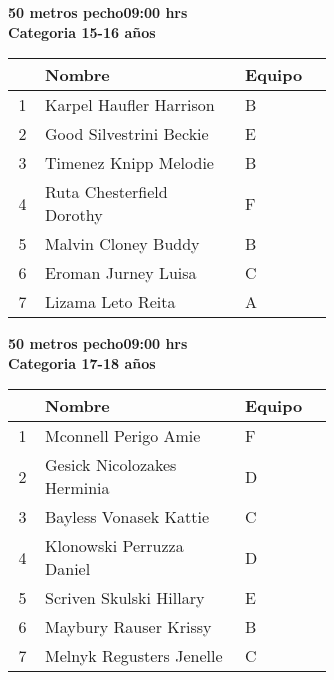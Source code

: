 \begin{minipage}{0.95\linewidth}\vspace{0.5cm} 
\begin{flushleft}
\textbf{
\hspace{-0.15cm}50 metros pecho\hspace{1.5cm}09:00 hrs \\Categoria 15-16 años}\vspace{-0.2cm} 
\end{flushleft}
\begin{tabular}{cp{0.63\linewidth}l}
\hline
& \textbf{Nombre} & \textbf{Equipo} \\ \hline
1 & Karpel Haufler Harrison & B \\ 
2 & Good Silvestrini Beckie & E \\ 
3 & Timenez Knipp Melodie & B \\ 
4 & Ruta Chesterfield Dorothy & F \\ 
5 & Malvin Cloney Buddy & B \\ 
6 & Eroman Jurney Luisa & C \\ 
7 & Lizama Leto Reita & A \\ 
\end{tabular}
\end{minipage}
\begin{minipage}{0.95\linewidth}\vspace{0.5cm} 
\begin{flushleft}
\textbf{
\hspace{-0.15cm}50 metros pecho\hspace{1.5cm}09:00 hrs \\Categoria 17-18 años}\vspace{-0.2cm} 
\end{flushleft}
\begin{tabular}{cp{0.63\linewidth}l}
\hline
& \textbf{Nombre} & \textbf{Equipo} \\ \hline
1 & Mconnell Perigo Amie & F \\ 
2 & Gesick Nicolozakes Herminia & D \\ 
3 & Bayless Vonasek Kattie & C \\ 
4 & Klonowski Perruzza Daniel & D \\ 
5 & Scriven Skulski Hillary & E \\ 
6 & Maybury Rauser Krissy & B \\ 
7 & Melnyk Regusters Jenelle & C \\ 
\end{tabular}
\end{minipage}
